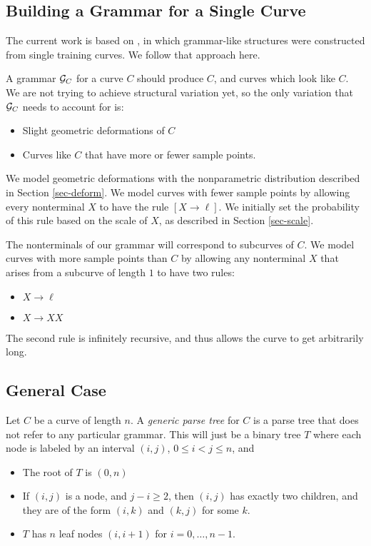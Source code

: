 
\subsection{Building a Grammar for a Single Curve}
\label{sec-single}

The current work is based on \cite{hcm}, in which grammar-like
structures were constructed from single training curves. We follow
that approach here.

A grammar ${\mathcal G}_C$ for a curve $C$ should produce $C$, and curves
which look like $C$. We are not trying to achieve structural variation
yet, so the only variation that ${\mathcal G}_C$ needs to account for is:
\begin{itemize}
\item Slight geometric deformations of $C$
\item Curves like $C$ that have more or fewer sample points.
\end{itemize}
We model geometric deformations with the nonparametric distribution
described in Section \ref{sec-deform}. We model curves with fewer sample
points by allowing every nonterminal $X$ to have the rule $[X\to
\ell]$. We initially set the probability of this rule based on the
scale of $X$, as described in Section \ref{sec-scale}.

The nonterminals of our grammar will correspond to subcurves of $C$.
We model curves with more sample points than $C$ by allowing any
nonterminal $X$ that arises from a subcurve of length $1$ to have two
rules:
\begin{itemize}
\item $X\to \ell$
\item $X\to XX$
\end{itemize}
The second rule is infinitely recursive, and thus allows the curve to
get arbitrarily long.

\subsection{General Case}

Let $C$ be a curve of length $n$. A \emph{generic parse tree} for $C$
is a parse tree that does not refer to any particular grammar. This
will just be a binary tree $T$ where each node is labeled by an
interval $(i,j)$, $0\le i < j \le n$, and
\begin{itemize}
\item The root of $T$ is $(0,n)$
\item If $(i,j)$ is a node, and $j-i \ge 2$, then $(i,j)$ has exactly
  two children, and they are of the form $(i,k)$ and $(k,j)$ for some
  $k$.
\item $T$ has $n$ leaf nodes $(i,i+1)$ for $i=0,\dots,n-1$.
\end{itemize}

